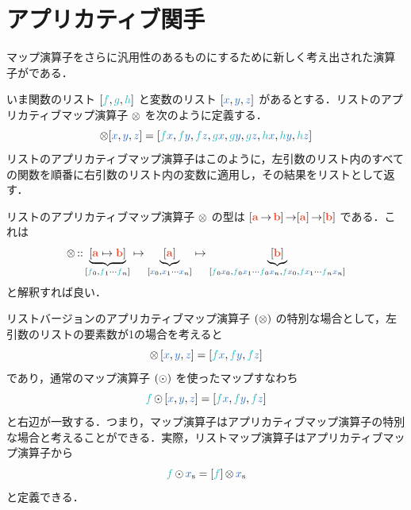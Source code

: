 \documentclass[a5paper,twoside,fleqn,draft]{jsbook}
\begin{document}
\section{アプリカティブ関手}

マップ演算子をさらに汎用性のあるものにするために新しく考え出された演算子がである．

いま関数のリスト $[\hFunc{f},\hFunc{g},\mHFunc]$ と変数のリスト $[\hVar{x},\hVar{y},\hVar{z}]$ があるとする．リストのアプリカティブマップ演算子 $\operatorname{\otimes}$ を次のように定義する．
\begin{equation}
  [\hFunc{f},\hFunc{g},\mHFunc]\mAppMapList[\hVar{x},\hVar{y},\hVar{z}]
  =[\hFunc{f}\hVar{x},\hFunc{f}\hVar{y},\hFunc{f}\hVar{z},\hFunc{g}\hVar{x},\hFunc{g}\hVar{y},\hFunc{g}\hVar{z},\mHFunc\hVar{x},\mHFunc\hVar{y},\mHFunc\hVar{z}]
\end{equation}
リストのアプリカティブマップ演算子はこのように，左引数のリスト内のすべての関数を順番に右引数のリスト内の変数に適用し，その結果をリストとして返す．

リストのアプリカティブマップ演算子 $\operatorname{\otimes}$ の型は
$[\mA\mFuncArrow\mB]\mFuncArrow[\mA]\mFuncArrow[\mB]$ である．これは
\begin{equation}
  \mAppMapList
  \mIn\underbrace{[\mA\mapsto\mB]}_{[\hFunc{f}_0,\hFunc{f}_1\dotsb \hFunc{f}_n]}
  \mapsto\underbrace{[\mA]}_{[\hVar{x}_0,\hVar{x}_1\dotsb \hVar{x}_n]}
  \mapsto\underbrace{[\mB]}_{[\hFunc{f}_0\hVar{x}_0,\hFunc{f}_0\hVar{x}_1\dotsb \hFunc{f}_0\hVar{x}_n,\hFunc{f} \hVar{x}_0,\hFunc{f} \hVar{x}_1\dotsb \hFunc{f}_n\hVar{x}_n]}
\end{equation}
と解釈すれば良い．

リストバージョンのアプリカティブマップ演算子 $(\operatorname{\otimes})$ の特別な場合として，左引数のリストの要素数が1の場合を考えると
\begin{equation}
  [\hFunc{f}]\mAppMapList{}[\hVar{x},\hVar{y},\hVar{z}]
  =[\hFunc{f}\hVar{x},\hFunc{f}\hVar{y},\hFunc{f}\hVar{z}]
\end{equation}
であり，通常のマップ演算子 $(\operatorname{\odot})$ を使ったマップすなわち
\begin{equation}
  \hFunc{f}\mMapList{}[\hVar{x},\hVar{y},\hVar{z}]
  =[\hFunc{f}\hVar{x},\hFunc{f}\hVar{y},\hFunc{f}\hVar{z}]
\end{equation}
と右辺が一致する．つまり，マップ演算子はアプリカティブマップ演算子の特別な場合と考えることができる．実際，リストマップ演算子はアプリカティブマップ演算子から
\begin{equation}
  \hFunc{f}\mMapList\mList{x}
  =[\hFunc{f}]\mAppMapList\mList{x}
\end{equation}
と定義できる．
\end{document}

